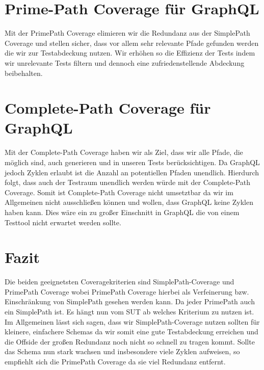 \section{Prime-Path Coverage für GraphQL}

Mit der PrimePath Coverage elimieren wir die Redundanz aus der SimplePath Coverage und stellen sicher, dass
vor allem sehr relevante Pfade gefunden werden die wir zur Testabdeckung nutzen.
Wir erhöhen so die Effizienz der Tests indem wir unrelevante Tests filtern und dennoch eine zufriedenstellende Abdeckung beibehalten.

\section{Complete-Path Coverage für GraphQL}

Mit der Complete-Path Coverage haben wir als Ziel, dass wir alle Pfade, die möglich sind, auch generieren und in unseren
Tests berücksichtigen.
Da GraphQL jedoch Zyklen erlaubt ist die Anzahl an potentiellen Pfaden unendlich.
Hierdurch folgt, dass auch der Testraum unendlich werden würde mit der Complete-Path Coverage.
Somit ist Complete-Path Coverage nicht umsetztbar da wir im Allgemeinen nicht ausschließen können und wollen, dass GraphQL
keine Zyklen haben kann.
Dies wäre ein zu großer Einschnitt in GraphQL die von einem Testtool nicht erwartet werden sollte.

\section{Fazit}

Die beiden geeignetsten Coveragekriterien sind SimplePath-Coverage und PrimePath Coverage wobei PrimePath Coverage hierbei
als Verfeinerung bzw. Einschränkung von SimplePath gesehen werden kann.
Da jeder PrimePath auch ein SimplePath ist.
Es hängt nun vom SUT ab welches Kriterium zu nutzen ist.
Im Allgemeinen lässt sich sagen, dass wir SimplePath-Coverage nutzen sollten für kleinere, einfachere Schemas da
wir somit eine gute Testabdeckung erreichen und die Offside der großen Redundanz noch nicht so schnell zu tragen kommt.
Sollte das Schema nun stark wachsen und insbesondere viele Zyklen aufweisen, so empfiehlt sich die PrimePath Coverage da
sie viel Redundanz entfernt.
